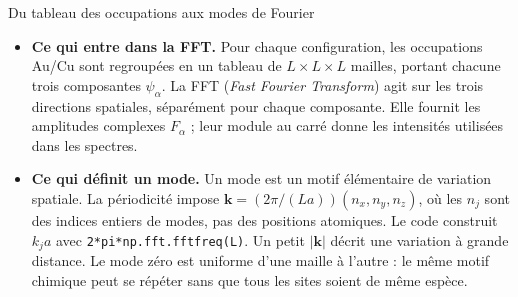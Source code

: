 \begin{oral}{Du tableau des occupations aux modes de Fourier}
\begin{itemize}
\item \textbf{Ce qui entre dans la FFT.} Pour chaque configuration, les occupations Au/Cu sont regroupées en un tableau de $L\times L\times L$ mailles, portant chacune trois composantes $\psi_\alpha$. La FFT (\emph{Fast Fourier Transform}) agit sur les trois directions spatiales, séparément pour chaque composante. Elle fournit les amplitudes complexes $F_\alpha$ ; leur module au carré donne les intensités utilisées dans les spectres.
\item \textbf{Ce qui définit un mode.} Un mode est un motif élémentaire de variation spatiale. La périodicité impose $\mathbf k=(2\pi/(La))(n_x,n_y,n_z)$, où les $n_j$ sont des indices entiers de modes, pas des positions atomiques. Le code construit $k_ja$ avec \texttt{2*pi*np.fft.fftfreq(L)}. Un petit $|\mathbf k|$ décrit une variation à grande distance. Le mode zéro est uniforme d'une maille à l'autre : le même motif chimique peut se répéter sans que tous les sites soient de même espèce.
\end{itemize}\end{oral}
